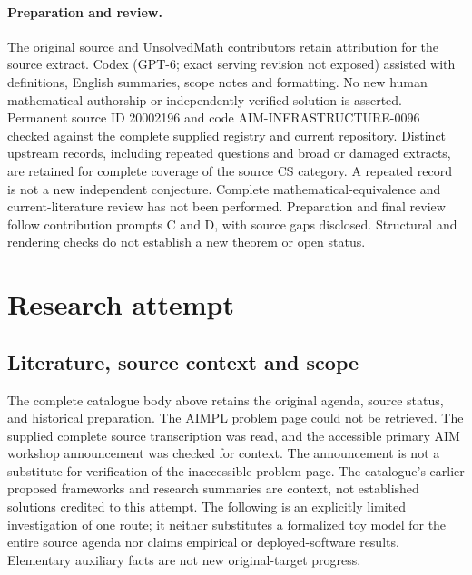 \documentclass[11pt]{article}
\begin{document}
\paragraph{Preparation and review.}
The original source and UnsolvedMath contributors retain attribution for the source extract. Codex (GPT-6; exact serving revision not exposed) assisted with definitions, English summaries, scope notes and formatting. No new human mathematical authorship or independently verified solution is asserted. Permanent source ID 20002196 and code AIM-INFRASTRUCTURE-0096 checked against the complete supplied registry and current repository. Distinct upstream records, including repeated questions and broad or damaged extracts, are retained for complete coverage of the source CS category. A repeated record is not a new independent conjecture. Complete mathematical-equivalence and current-literature review has not been performed. Preparation and final review follow contribution prompts C and D, with source gaps disclosed. Structural and rendering checks do not establish a new theorem or open status.
\label{end:20002196}

\section{Research attempt}
\subsection{Literature, source context and scope}
The complete catalogue body above retains the original agenda, source status, and historical preparation. The AIMPL problem page could not be retrieved. The supplied complete source transcription was read, and the accessible primary AIM workshop announcement was checked for context. The announcement is not a substitute for verification of the inaccessible problem page. The catalogue's earlier proposed frameworks and research summaries are context, not established solutions credited to this attempt. The following is an explicitly limited investigation of one route; it neither substitutes a formalized toy model for the entire source agenda nor claims empirical or deployed-software results. Elementary auxiliary facts are not new original-target progress.
\end{document}
